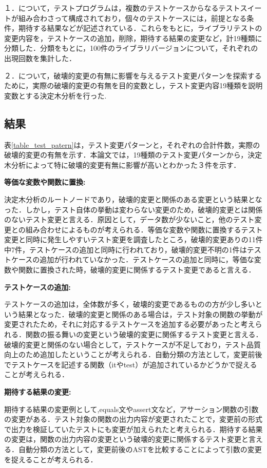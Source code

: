 \documentclass[uplatex,dvipdfmx,a4paper,twocolumn,base=11pt,jbase=11pt,ja=standard]{bxjsarticle}  %
\begin{document}
１．について，テストプログラムは，複数のテストケースからなるテストスイートが組み合わさって構成されており，個々のテストケースには，前提となる条件，期待する結果などが記述されている．これらをもとに，ライブラリテストの変更内容を，テストケースの追加，削除，期待する結果の変更など，計19種類に分類した．分類をもとに，100件のライブラリバージョンについて，それぞれの出現回数を集計した．

２．について，破壊的変更の有無に影響を与えるテスト変更パターンを探索するために，実際の破壊的変更の有無を目的変数とし，テスト変更内容19種類を説明変数とする決定木分析を行った.

\subsection{結果}

表\ref{table_test_patern}は，テスト変更パターンと，それぞれの合計件数，実際の破壊的変更の有無を示す．本論文では，19種類のテスト変更パターンから，決定木分析によって特に破壊的変更有無に影響が高いとわかった３件を示す．

\noindent\textbf{等価な変数や関数に置換: }

決定木分析のルートノードであり，破壊的変更と関係のある変更という結果となった．しかし，テスト自体の挙動は変わらない変更のため，破壊的変更とは関係のないテスト変更と言える．原因として，データ数が少ないこと，他のテスト変更との組み合わせによるものが考えられる．等価な変数や関数に置換するテスト変更と同時に発生しやすいテスト変更を調査したところ，破壊的変更ありの11件中7件，テストケースの追加と同時に行われており，破壊的変更不明の1件はテストケースの追加が行われていなかった．テストケースの追加と同時に，等価な変数や関数に置換された時，破壊的変更に関係するテスト変更であると言える．

\noindent\textbf{テストケースの追加: }

テストケースの追加は，全体数が多く，破壊的変更であるものの方が少し多いという結果となった．破壊的変更と関係のある場合は，テスト対象の関数の挙動が変更されたため，それに対応するテストケースを追加する必要があったと考えられる．関数の振る舞いの変更という破壊的変更に関係するテスト変更と言える．破壊的変更と関係のない場合として，テストケースが不足しており，テスト品質向上のため追加したということが考えられる．自動分類の方法として，変更前後でテストケースを記述する関数（itやtest）が追加されているかどうかで捉えることが考えられる．
    
\noindent\textbf{期待する結果の変更: }

期待する結果の変更例として,equals文やassert文など，アサーション関数の引数の変更がある．テスト対象の関数の出力内容が変更されたことで，変更前の形式で出力を検証していたテストにも変更が加えられたと考えられる．期待する結果の変更は，関数の出力内容の変更という破壊的変更に関係するテスト変更と言える．自動分類の方法として，変更前後のASTを比較することによって引数の変更を捉えることが考えられる．
\end{document}

